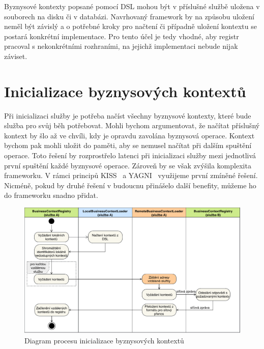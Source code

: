 Byznysové kontexty popsané pomocí \gls{DSL} mohou být v příslušné službě uložena v souborech na disku či v
databázi. Navrhovaný framework by na způsobu uložení neměl být závislý a o potřebné kroky
pro načtení či případně uložení kontextu se postará konkrétní implementace. Pro tento účel
je tedy vhodné, aby registr pracoval s nekonkrétními rozhraními, na jejichž implementaci
nebude nijak záviset.

\section{Inicializace byznysových kontextů}
Při inicializaci služby je potřeba načíst všechny byznysové kontexty, které bude služba
pro svůj běh potřebovat. Mohli bychom argumentovat, že načítat příslušný kontext by šlo
až ve chvíli, kdy je opravdu zavolána byznysová operace. Kontext bychom pak mohli uložit
do paměti, aby se nemusel načítat při dalším spuštění operace. Toto řešení by rozprostřelo
latenci při inicializaci služby mezi jednotlivá první spuštění každé byznysové operace.
Zároveň by se však zvýšila komplexita frameworku. V rámci principů \gls{KISS}~\cite{kiss}
a \gls{YAGNI}~\cite{beck2000extreme} využijeme první zmíněné řešení. Nicméně, pokud by druhé
řešení v budoucnu přinášelo další benefity, můžeme ho do frameworku snadno přidat.

\begin{figure}
    \centering
    \includegraphics[keepaspectratio=true, width=\linewidth]{figures/business-context-loading.pdf}
    \caption{Diagram procesu inicializace byznysov\'ych kontextů}
    \label{fig:business-context-loading}
\end{figure}

